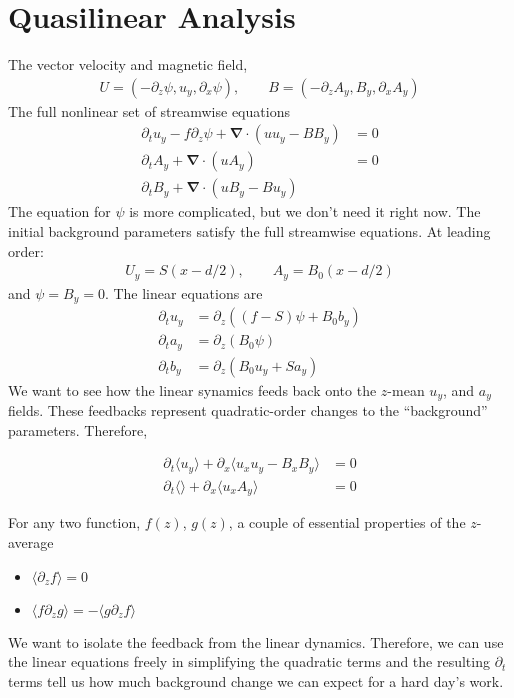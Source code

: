 \documentclass[10pt]{article}
\renewcommand{\vec}[1]{\boldsymbol{#1}}
\newcommand{\grad}{\vec{\nabla}}
\begin{document}
\section{Quasilinear Analysis}

The vector velocity and magnetic field,
\begin{align*}
    U=(-\partial_z\psi, u_y, \partial_x\psi), \qquad B=(-\partial_zA_y, B_y, \partial_xA_y)
\end{align*}
The full nonlinear set of streamwise equations
\begin{align*}
    \partial_tu_y - f\partial_z\psi + \grad\cdot(uu_y - BB_y) &= 0 \\
    \partial_tA_y + \grad\cdot(uA_y) &= 0 \\
    \partial_tB_y + \grad\cdot(uB_y - Bu_y)
\end{align*}
The equation for $\psi$ is more complicated, but we don't need it right now.
The initial background parameters satisfy the full streamwise equations. At leading order:
\begin{align*}
    U_y = S(x - d/2), \qquad A_y = B_0 (x - d/2)
\end{align*}
and $\psi=B_y=0$.
The linear equations are
\begin{align*}
    \partial_t u_y &= \partial_z ((f-S)\psi + B_0b_y) \\
    \partial_t a_y &= \partial_z(B_0\psi) \\
    \partial_t b_y &= \partial_z(B_0u_y + Sa_y)
\end{align*}
We want to see how the linear synamics feeds back onto the $z$-mean $u_y$, and $a_y$ fields. 
These feedbacks represent quadratic-order changes to the ``background'' parameters.
Therefore,

\begin{align*}
    \partial_t\langle u_y \rangle + \partial_x \langle u_xu_y - B_xB_y \rangle &= 0 \\
    \partial_t \langle \rangle + \partial_x \langle u_x A_y \rangle &= 0
\end{align*}

For any two function, $f(z)$, $g(z)$, a couple of essential properties of the $z$-average
\begin{itemize}
    \item $\langle \partial_z f \rangle = 0$
    \item $\langle f\partial_z g \rangle = -\langle g\partial_z f \rangle$
\end{itemize}

We want to isolate the feedback from the linear dynamics.
Therefore, we can use the linear equations freely in simplifying the quadratic terms and the resulting $\partial_t$ terms tell us how much background change we can expect for a hard day's work.
\end{document}
